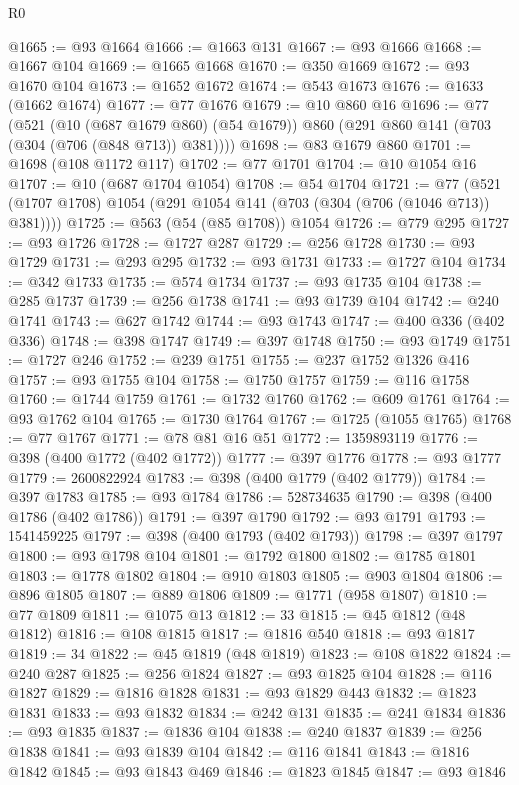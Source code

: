 \begin{lexlean}{R0}
\begin{coremodule}
@1665 := @93 @1664
@1666 := @1663 @131
@1667 := @93 @1666
@1668 := @1667 @104
@1669 := @1665 @1668
@1670 := @350 @1669
@1672 := @93 @1670 @104
@1673 := @1652 @1672
@1674 := @543 @1673
@1676 := @1633 (@1662 @1674)
@1677 := @77 @1676
@1679 := @10 @860 @16
@1696 := @77
    (@521
      (@10 (@687 @1679 @860) (@54 @1679))
      @860
      (@291 @860 @141 (@703 (@304 (@706 (@848 @713)) @381))))
@1698 := @83 @1679 @860
@1701 := @1698 (@108 @1172 @117)
@1702 := @77 @1701
@1704 := @10 @1054 @16
@1707 := @10 (@687 @1704 @1054)
@1708 := @54 @1704
@1721 := @77 (@521 (@1707 @1708) @1054 (@291 @1054 @141 (@703 (@304 (@706 (@1046 @713)) @381))))
@1725 := @563 (@54 (@85 @1708)) @1054
@1726 := @779 @295
@1727 := @93 @1726
@1728 := @1727 @287
@1729 := @256 @1728
@1730 := @93 @1729
@1731 := @293 @295
@1732 := @93 @1731
@1733 := @1727 @104
@1734 := @342 @1733
@1735 := @574 @1734
@1737 := @93 @1735 @104
@1738 := @285 @1737
@1739 := @256 @1738
@1741 := @93 @1739 @104
@1742 := @240 @1741
@1743 := @627 @1742
@1744 := @93 @1743
@1747 := @400 @336 (@402 @336)
@1748 := @398 @1747
@1749 := @397 @1748
@1750 := @93 @1749
@1751 := @1727 @246
@1752 := @239 @1751
@1755 := @237 @1752 @1326 @416
@1757 := @93 @1755 @104
@1758 := @1750 @1757
@1759 := @116 @1758
@1760 := @1744 @1759
@1761 := @1732 @1760
@1762 := @609 @1761
@1764 := @93 @1762 @104
@1765 := @1730 @1764
@1767 := @1725 (@1055 @1765)
@1768 := @77 @1767
@1771 := @78 @81 @16 @51
@1772 := 1359893119
@1776 := @398 (@400 @1772 (@402 @1772))
@1777 := @397 @1776
@1778 := @93 @1777
@1779 := 2600822924
@1783 := @398 (@400 @1779 (@402 @1779))
@1784 := @397 @1783
@1785 := @93 @1784
@1786 := 528734635
@1790 := @398 (@400 @1786 (@402 @1786))
@1791 := @397 @1790
@1792 := @93 @1791
@1793 := 1541459225
@1797 := @398 (@400 @1793 (@402 @1793))
@1798 := @397 @1797
@1800 := @93 @1798 @104
@1801 := @1792 @1800
@1802 := @1785 @1801
@1803 := @1778 @1802
@1804 := @910 @1803
@1805 := @903 @1804
@1806 := @896 @1805
@1807 := @889 @1806
@1809 := @1771 (@958 @1807)
@1810 := @77 @1809
@1811 := @1075 @13
@1812 := 33
@1815 := @45 @1812 (@48 @1812)
@1816 := @108 @1815
@1817 := @1816 @540
@1818 := @93 @1817
@1819 := 34
@1822 := @45 @1819 (@48 @1819)
@1823 := @108 @1822
@1824 := @240 @287
@1825 := @256 @1824
@1827 := @93 @1825 @104
@1828 := @116 @1827
@1829 := @1816 @1828
@1831 := @93 @1829 @443
@1832 := @1823 @1831
@1833 := @93 @1832
@1834 := @242 @131
@1835 := @241 @1834
@1836 := @93 @1835
@1837 := @1836 @104
@1838 := @240 @1837
@1839 := @256 @1838
@1841 := @93 @1839 @104
@1842 := @116 @1841
@1843 := @1816 @1842
@1845 := @93 @1843 @469
@1846 := @1823 @1845
@1847 := @93 @1846

\end{coremodule}
\end{lexlean}
